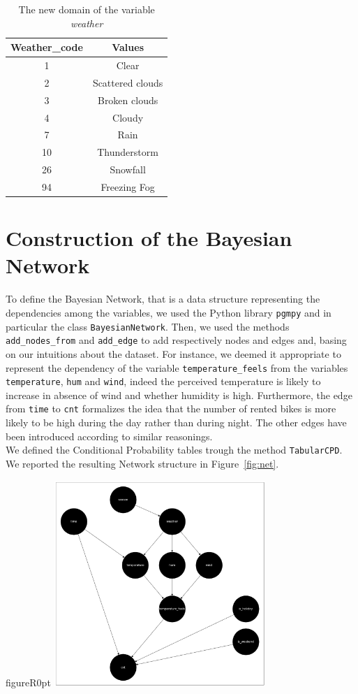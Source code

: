 \documentclass[letterpaper,11pt]{article}
\begin{document}
\begin{table}[!htb]
\centering
\begin{tabular}{cc} 
\hline
\multicolumn{1}{c}{Weather\_code} & \multicolumn{1}{c}{Values} \\
\hline
1 &   Clear \\
2 &  Scattered clouds  \\
3 & Broken clouds\\
4 & Cloudy\\
7 &   Rain \\
10 &  Thunderstorm  \\
26 & Snowfall\\
94 & Freezing Fog\\
\hline
\end{tabular}
\caption{The new domain of the variable \textit{weather}}
\label{tab:code}
\end{table}

\section{Construction of the Bayesian Network}

To define the Bayesian Network, that is a data structure 
representing the dependencies among the variables,  we used the Python library \texttt{pgmpy} and 
in particular the class \texttt{BayesianNetwork}. Then, we used the methods \texttt{add\_nodes\_from}
and \texttt{add\_edge} to add respectively nodes and edges and,  basing on our intuitions about the dataset.
For instance, we deemed it appropriate to represent the dependency of the variable \texttt{temperature\_feels}
from the variables \texttt{temperature}, \texttt{hum} and \texttt{wind}, indeed the perceived temperature
is likely to increase in absence of wind and whether humidity is high. Furthermore, the edge from \texttt{time}
to \texttt{cnt} formalizes the idea that the number of rented bikes is more likely to be high during the day
rather than during night. The other edges have been introduced according to similar reasonings.\\
We defined the Conditional Probability tables trough the method \texttt{TabularCPD}.
We reported the resulting Network structure in Figure~\ref{fig:net}.

\begin{wrapfloat}{figure}{R}{0pt}
  \includegraphics[width=0.6\textwidth]{network.png}
  \caption{The Network structure}
  \label{fig:net}
  \end{wrapfloat}
\end{document}
